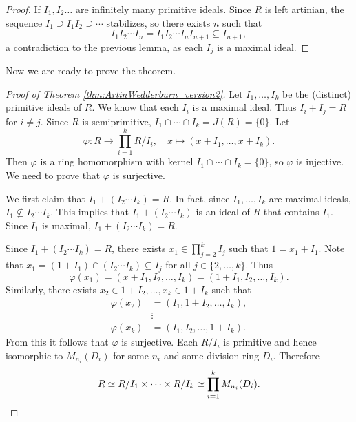 \begin{proof}
    If $I_1,I_2\dots$ are infinitely many primitive ideals. 
    Since $R$ is left artinian, the sequence 
    $I_1\supseteq I_1I_2\supseteq\cdots$ stabilizes, so there
    exists $n$ such that 
    \[
    I_1I_2\cdots I_n=I_1I_2\cdots I_nI_{n+1}\subseteq I_{n+1},
    \]
    a contradiction to the previous lemma, 
    as each $I_j$ is a maximal ideal. 
\end{proof}

Now we are ready to prove the theorem. 

\begin{proof}[Proof of Theorem \ref{thm:ArtinWedderburn_version2}]
    Let $I_1,\dots,I_k$ be the (distinct) primitive ideals of $R$. 
    We know that each $I_i$ is a maximal ideal. Thus $I_i+I_j=R$ for
    $i\ne j$. Since $R$ is semiprimitive, 
    $I_1\cap\cdots\cap I_k=J(R)=\{0\}$. Let 
    \[
    \varphi\colon R\to \prod_{i=1}^k R/I_i,\quad
    x\mapsto (x+I_1,\dots,x+I_k).
    \]
    Then $\varphi$ is a ring homomorphism with kernel $I_1\cap\cdots\cap I_k=\{0\}$, so
    $\varphi$ is injective. We need to prove that $\varphi$ is surjective. 
    
    We first claim that 
    $I_1+( I_2\cdots I_k) = R$. In fact, 
    since $I_1,\dots,I_k$ are maximal ideals, $I_1\not\subseteq I_2\cdots I_k$. This implies
    that $I_1+(I_2\cdots I_k)$ is an ideal of $R$ that contains $I_1$. Since $I_1$ is maximal, 
    $I_1+(I_2\cdots I_k)=R$. 
    
    Since $I_1+( I_2\cdots I_k) = R$, 
    there exists $x_1\in \prod_{j=2}^kI_j$ such that $1=x_1+I_1$. Note that
    $x_1=(1+I_1)\cap (I_2\cdots I_k)\subseteq I_j$ for all $j\in\{2,\dots,k\}$. 
    Thus 
    \[
    \varphi(x_1)=(x+I_1,I_2,\dots,I_k)=(1+I_1,I_2,\dots, I_k).
    \]
    Similarly,
    there exists $x_2\in 1+I_2,\dots, x_k\in 1+I_k$ such that 
    \begin{align*}
    \varphi(x_2)&=(I_1,1+I_2,\dots,I_k),\\
    &\vdots\\
    \varphi(x_k)&=(I_1,I_2,\dots,1+I_k).
    \end{align*}
    From this it follows that $\varphi$ is surjective. Each $R/I_i$ 
    is primitive and hence isomorphic to $M_{n_i}(D_i)$ for some 
    $n_i$ and some division ring $D_i$. Therefore
    \[
    R\simeq R/I_1\times\cdots\times R/I_k\simeq \prod_{i=1}^kM_{n_i}(D_i).\qedhere 
    \]
\end{proof}


